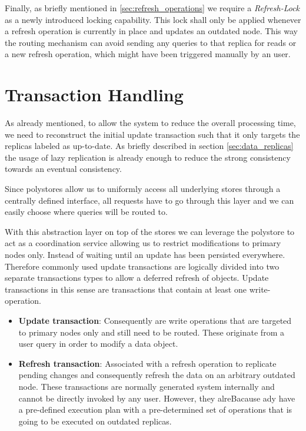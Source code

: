 Finally, as briefly mentioned in \ref{sec:refresh_operations} we require a \emph{Refresh-Lock} as a newly introduced locking capability.
This lock shall only be applied whenever a refresh operation is currently in place and updates an outdated node. 
This way the routing mechanism can avoid sending any queries to that replica for reads or a new refresh operation, which might have been triggered manually by an user.




\section{Transaction Handling}
\label{sec:tx_handling}

As already mentioned, to allow the system to reduce the overall processing time, we need to reconstruct the initial update transaction such that it only 
targets the replicas labeled as up-to-date. As briefly described in section \ref{sec:data_replicas} the usage of lazy replication is already enough to reduce the strong
consistency towards an eventual consistency.

Since polystores allow us to uniformly access all underlying stores through a centrally defined interface, 
all requests have to go through this layer and we can easily choose where queries will be routed to. 

With this abstraction layer on top of the stores we can leverage the polystore to act as a coordination service allowing us to restrict modifications to primary nodes only. 
Instead of waiting until an update has been persisted everywhere.
Therefore commonly used update transactions are logically divided into two separate transactions types to allow a deferred refresh of objects.
Update transactions in this sense are transactions that contain at least one write-operation.
\begin{itemize}
    \item \textbf{Update transaction}:  Consequently are write operations that are targeted to primary nodes only and still need to be routed. 
                                        These originate from a user query in order to modify a data object.

    \item \textbf{Refresh transaction}: Associated with a refresh operation to replicate pending changes and consequently refresh the data on an arbitrary outdated node.
                                        These transactions are normally generated system internally and cannot be directly invoked by any user. 
                                        However, they alreBacause ady have a pre-defined execution plan with a pre-determined set of operations that is going to be executed on outdated replicas.               
\end{itemize}


